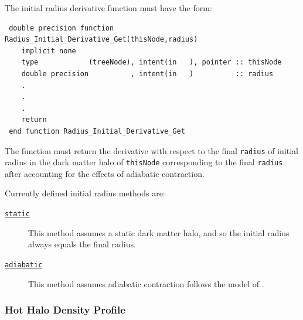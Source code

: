 The initial radius derivative function must have the form:
\begin{verbatim}
 double precision function Radius_Initial_Derivative_Get(thisNode,radius)
    implicit none
    type            (treeNode), intent(in   ), pointer :: thisNode
    double precision          , intent(in   )          :: radius
    .
    .
    .
    return
 end function Radius_Initial_Derivative_Get
\end{verbatim}
The function must return the derivative with respect to the final {\tt radius} of initial radius in the dark matter halo of {\tt thisNode} corresponding to the final {\tt radius} after accounting for the effects of adiabatic contraction.

Currently defined initial radius methods are:
\begin{description}
 \item [\hyperlink{galactic_structure.radius_solver.initial_radii.static.F90:galactic_structure_initial_radii_static:galactic_structure_radius_initial_static}{{\tt static}}] This method assumes a static dark matter halo, and so the initial radius always equals the final radius.
 \item [\hyperlink{galactic_structure.radius_solver.initial_radii.adiabatic.F90:galactic_structure_initial_radii_adiabatic:galactic_structure_radius_initial_adiabatic}{{\tt adiabatic}}] This method assumes adiabatic contraction follows the model of \cite{gnedin_response_2004}.
\end{description}


\subsubsection{Hot Halo Density Profile}

